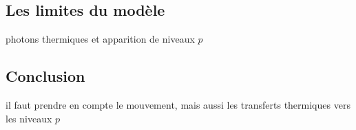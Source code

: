 	\subsection{Les limites du modèle}
		\noindent photons thermiques et apparition de niveaux $p$
	\subsection{Conclusion}
		\noindent il faut prendre en compte le mouvement, mais aussi les transferts thermiques vers les niveaux $p$
		
